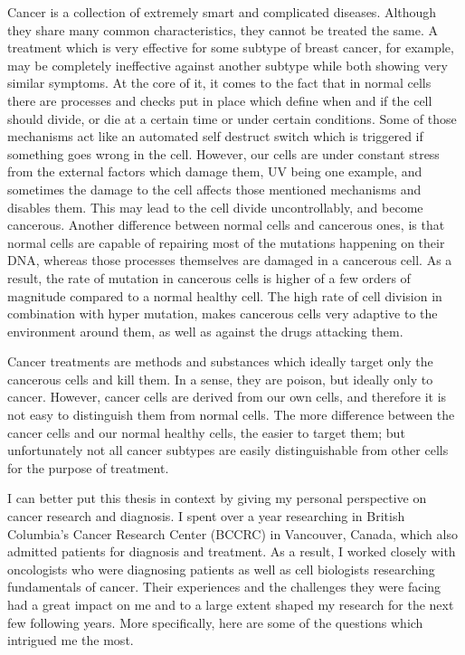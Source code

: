 Cancer is a collection of extremely smart and complicated diseases. Although
they share many common characteristics, they cannot be treated the same. A
treatment which is very effective for some subtype of breast cancer, for
example, may be completely ineffective against another subtype while both
showing very similar symptoms. At the core of it, it comes to the fact that in
normal cells there are processes and checks put in place which define when and
if the cell should divide, or die at a certain time or under certain conditions.
Some of those mechanisms act like an automated self destruct switch which is
triggered if something goes wrong in the cell. However, our cells are under
constant stress from the external factors which damage them, UV being one
example, and sometimes the damage to the cell affects those mentioned mechanisms
and disables them. This may lead to the cell divide uncontrollably, and become
cancerous. Another difference between normal cells and cancerous ones, is that
normal cells are capable of repairing most of the mutations happening on their
DNA, whereas those processes themselves are damaged in a cancerous cell. As a
result, the rate of mutation in cancerous cells is higher of a few orders of
magnitude compared to a normal healthy cell. The high rate of cell division in
combination with hyper mutation, makes cancerous cells very adaptive to the
environment around them, as well as against the drugs attacking them.

Cancer treatments are methods and substances which ideally target only the
cancerous cells and kill them. In a sense, they are poison, but ideally only to
cancer. However, cancer cells are derived from our own cells, and therefore it
is not easy to distinguish them from normal cells. The more difference between
the cancer cells and our normal healthy cells, the easier to target them; but
unfortunately not all cancer subtypes are easily distinguishable from other
cells for the purpose of treatment.

I can better put this thesis in context by giving my personal perspective on
cancer research and diagnosis. I spent over a year researching in British
Columbia's Cancer Research Center (BCCRC) in Vancouver, Canada, which also
admitted patients for diagnosis and treatment. As a result, I worked closely
with oncologists who were diagnosing patients as well as cell biologists
researching fundamentals of cancer. Their experiences and the challenges they
were facing had a great impact on me and to a large extent shaped my research
for the next few following years. More specifically, here are some of the
questions which intrigued me the most.

